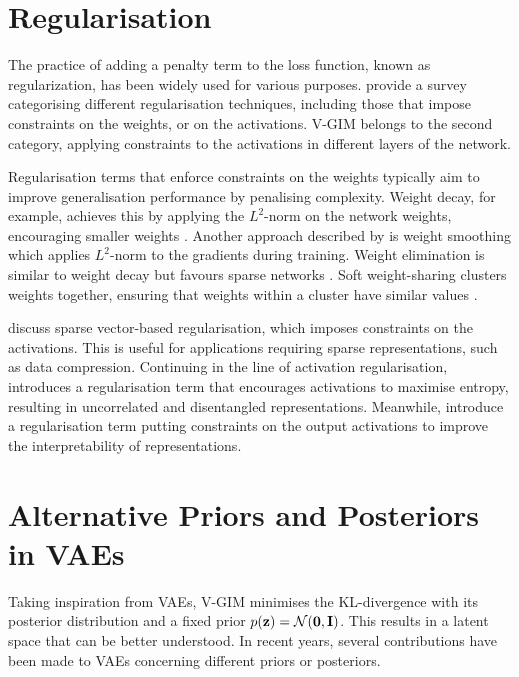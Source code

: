 	
	

\section{Regularisation}
	The practice of adding a penalty term to the loss function, known as regularization, has been widely used for various purposes. \cite{kukackaRegularizationDeepLearning2017} provide a survey categorising different regularisation techniques, including those that impose constraints on the weights, or on the activations. V-GIM belongs to the second category, applying constraints to the activations in different layers of the network.
	
	Regularisation terms that enforce constraints on the weights typically aim to improve generalisation performance by penalising complexity. Weight decay, for example, achieves this by applying the $L^2$-norm on the network weights, encouraging smaller weights \citep{gneccoWeightdecayTechniqueLearning2009}. Another approach described by \cite{kukackaRegularizationDeepLearning2017} is weight smoothing which applies $L^2$-norm to the gradients during training. Weight elimination is similar to weight decay but favours sparse networks \citep{weigendGeneralizationWeightEliminationApplication1990}. Soft weight-sharing clusters weights together, ensuring that weights within a cluster have similar values \citep{nowlanSimplifyingNeuralNetworks1992}.
	
	\cite{tianComprehensiveSurveyRegularization2022} discuss sparse vector-based regularisation, which imposes constraints on the activations. This is useful for applications requiring sparse representations, such as data compression. Continuing in the line of activation regularisation, \cite{tomczakLearningInformativeFeatures2016} introduces a regularisation term that encourages activations to maximise entropy, resulting in uncorrelated and disentangled representations. Meanwhile, \cite{wuImprovingInterpretabilityRegularization2018} introduce a regularisation term putting constraints on the output activations to improve the interpretability of representations.


\section{Alternative Priors and Posteriors in VAEs} \label{cha:rel_alt_priors}
	Taking inspiration from VAEs, V-GIM minimises the KL-divergence with its posterior distribution and a fixed prior $p(\mathbf{z})=\mathcal{N}(\bm{\mathbf{0}}, \mathbf{I})$. This results in a latent space that can be better understood. In recent years, several contributions have been made to VAEs concerning different priors or posteriors.
	
